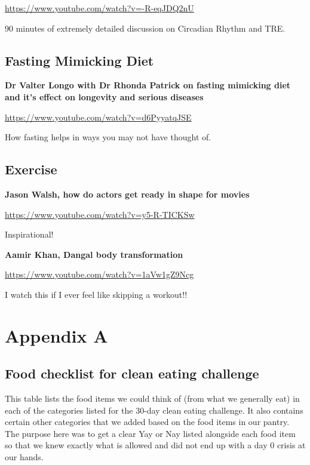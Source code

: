 \documentclass[
  oneside]{book}
\begin{document}
\url{https://www.youtube.com/watch?v=-R-eqJDQ2nU}

90 minutes of extremely detailed discussion on Circadian Rhythm and TRE.

\hypertarget{fasting-mimicking-diet}{%
\section{Fasting Mimicking Diet}\label{fasting-mimicking-diet}}

\textbf{Dr Valter Longo with Dr Rhonda Patrick on fasting mimicking diet and it's effect on longevity and serious diseases}

\url{https://www.youtube.com/watch?v=d6PyyatqJSE}

How fasting helps in ways you may not have thought of.

\hypertarget{exercise}{%
\section{Exercise}\label{exercise}}

\textbf{Jason Walsh, how do actors get ready in shape for movies}

\url{https://www.youtube.com/watch?v=y5-R-TICKSw}

Inspirational!

\textbf{Aamir Khan, Dangal body transformation}

\url{https://www.youtube.com/watch?v=1aVw1gZ9Ncg}

I watch this if I ever feel like skipping a workout!!

\hypertarget{appendix-a}{%
\chapter{Appendix A}\label{appendix-a}}

\hypertarget{food-checklist-for-clean-eating-challenge}{%
\section{Food checklist for clean eating challenge}\label{food-checklist-for-clean-eating-challenge}}

This table lists the food items we could think of (from what we generally eat) in each of the categories listed for the 30-day clean eating challenge. It also contains certain other categories that we added based on the food items in our pantry. The purpose here was to get a clear Yay or Nay listed alongside each food item so that we knew exactly what is allowed and did not end up with a day 0 crisis at our hands.
\end{document}
